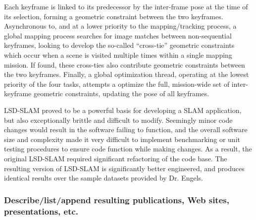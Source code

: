 \documentclass[letterpaper,12pt]{article}
\begin{document}
Each keyframe is linked to its predecessor by the inter-frame pose at the time of its selection, forming a geometric constraint between the two keyframes.   Asynchronous to, and at a lower priority to the mapping/tracking process, a global mapping process searches for image matches between non-sequential keyframes, looking to develop the so-called ``cross-tie'' geometric constraints which occur when a scene is visited multiple times within a single mapping mission.   If found, these cross-ties also contribute geometric constraints between the two keyframes.     Finally, a global optimization thread, operating at the lowest priority of the four tasks, attempts a optimize the full, mission-wide set of inter-keyframe geometric constraints, updating the pose of all keyframes.   

LSD-SLAM proved to be a powerful basis for developing a SLAM application, but also exceptionally brittle and difficult to modify.  Seemingly minor code changes would result in the software failing to function, and the overall software size and complexity made it very difficult to implement benchmarking or unit testing procedures to ensure code function while making changes.   As a result, the original LSD-SLAM required significant refactoring of the code base.  The resulting version of LSD-SLAM is significantly better engineered, and produces identical results over the sample datasets provided by Dr. Engels.   




\subsubsection*{Describe/list/append resulting publications, Web sites, presentations, etc.}


\end{document}
